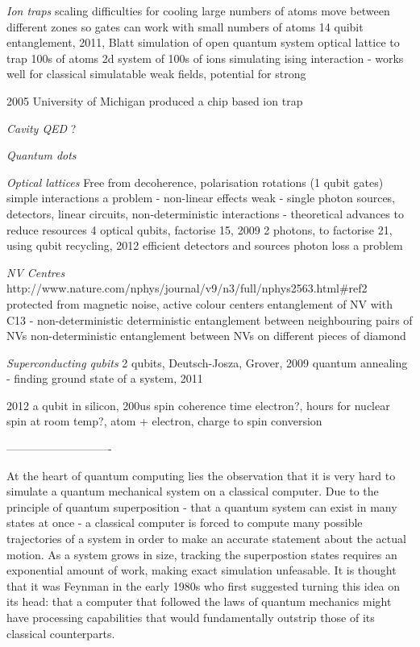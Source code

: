 \textit{Ion traps}
\cite{cirac_zoller_ion_trap_proposal_95}
\cite{first_ion_trap_wineland_98}
scaling difficulties for cooling large numbers of atoms
move between different zones so gates can work with small numbers of atoms
\cite{ion_trap_14_qubits} 14 quibit entanglement, 2011, Blatt
\cite{ion_trap_simulator} simulation of open quantum system
\cite{ion_trap_digital_simulator}
optical lattice to trap 100s of atoms
\cite{ion_trap_magnetism_simulator} 2d system of 100s of ions simulating ising interaction - works well for classical simulatable weak fields, potential for strong

2005 University of Michigan produced a chip based ion trap \cite{?}

\textit{Cavity QED}
?

\textit{Quantum dots}


\textit{Optical lattices}
Free from decoherence, polarisation rotations (1 qubit gates) simple
interactions a problem - non-linear effects weak
\cite{klm} - single photon sources, detectors, linear circuits, non-deterministic interactions
\cite{science_loqc_review} - theoretical advances to reduce resources
\cite{shor_chip_bristol} 4 optical qubits, factorise 15, 2009
\cite{shor_chip_bristol_2} 2 photons, to factorise 21, using qubit recycling, 2012
efficient detectors \cite{single_photon_detector_review_09} and sources \cite{single_photon_source_review_04}
photon loss a problem

\textit{NV Centres}
http://www.nature.com/nphys/journal/v9/n3/full/nphys2563.html#ref2
protected from magnetic noise, active colour centers
\cite{two_qubit_nv}
\cite{nv_entanglement_hanson} entanglement of NV with C13 - non-deterministic
\cite{nv_entanglement_dolde} deterministic entanglement between neighbouring pairs of NVs
\cite{remote_nv_entanglement_hanson} non-deterministic entanglement between NVs on different pieces of diamond

\textit{Superconducting qubits}
\cite{two_qubit_chip_yale} 2 qubits, Deutsch-Josza, Grover, 2009
\cite{dwave_annealing} quantum annealing - finding ground state of a system, 2011


\cite{silicon_qubit} 2012 a qubit in silicon, 200us spin coherence time electron?, hours for nuclear spin at room temp?, atom + electron, charge to spin conversion
\cite{silicon_seconds}


----------------------------

At the heart of quantum computing lies the observation that it is very hard to simulate a quantum mechanical system on a classical computer. Due to the principle of quantum superposition - that a quantum system can exist in many states at once - a classical computer is forced to compute many possible trajectories of a system in order to make an accurate statement about the actual motion. As a system grows in size, tracking the superpostion states requires an exponential amount of work, making exact simulation unfeasable. It is thought that it was Feynman in the early 1980s \cite{feynman82} who first suggested turning this idea on its head: that a computer that followed the laws of quantum mechanics might have processing capabilities that would fundamentally outstrip those of its classical counterparts. 

